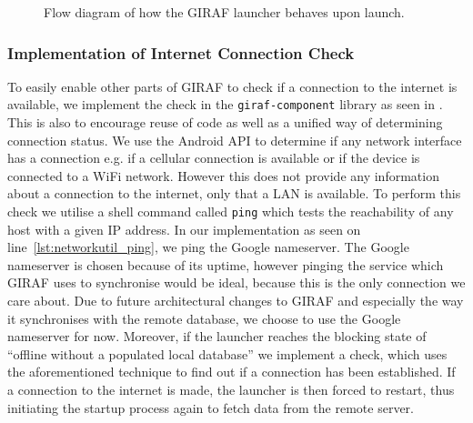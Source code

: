 \begin{figure}[h]
    \centering
    
    \caption{Flow diagram of how the GIRAF launcher behaves upon launch.}\label{fig:launcher_offline_flow}
\end{figure}

\subsubsection{Implementation of Internet Connection Check}
To easily enable other parts of GIRAF to check if a connection to the internet is available, we implement the check in the \texttt{giraf-component} library as seen in .
This is also to encourage reuse of code as well as a unified way of determining connection status.
We use the Android API to determine if any network interface has a connection e.g. if a cellular connection is available or if the device is connected to a WiFi network.
However this does not provide any information about a connection to the internet, only that a LAN is available.
To perform this check we utilise a shell command called \texttt{ping} which tests the reachability of any host with a given IP address.
In our implementation as seen on line~\ref{lst:networkutil_ping}, we ping the Google nameserver.
The Google nameserver is chosen because of its uptime, however pinging the service which GIRAF uses to synchronise would be ideal, because this is the only connection we care about.
Due to future architectural changes to GIRAF and especially the way it synchronises with the remote database, we choose to use the Google nameserver for now.
Moreover, if the launcher reaches the blocking state of \enquote{offline without a populated local database} we implement a check, which uses the aforementioned technique to find out if a connection has been established.
If a connection to the internet is made, the launcher is then forced to restart, thus initiating the startup process again to fetch data from the remote server.

